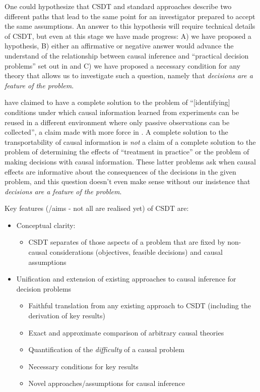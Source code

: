 One could hypothesize that CSDT and standard approaches describe two different paths that lead to the same point for an investigator prepared to accept the same assumptions. An answer to this hypothesis will require technical details of CSDT, but even at this stage we have made progress: A) we have proposed a hypothesis, B) either an affirmative or negative answer would advance the understand of the relationship between causal inference and ``practical decision problems'' set out in \citet{deaton_understanding_2018} and C) we have proposed a necessary condition for any theory that allows us to investigate such a question, namely that \emph{decisions are a feature of the problem}. 

\citet{bareinboim_transportability_2012} have claimed to have a complete solution to the problem of ``[identifying] conditions under which causal information learned from experiments can be reused in a different environment where only passive observations can be collected'', a claim made with more force in \citet{pearl_challenging_2018}. A complete solution to the transportability of causal information is \emph{not} a claim of a complete solution to the problem of determining the effects of ``treatment in practice'' or the problem of making decisions with causal information. These latter problems ask when causal effects are informative about the consequences of the decisions in the given problem, and this question doesn't even make sense without our insistence that \emph{decisions are a feature of the problem}.

Key features (/aims - not all are realised yet) of CSDT are:

\begin{itemize}
	\item Conceptual clarity:
	\begin{itemize}
		\item CSDT separates of those aspects of a problem that are fixed by non-causal considerations (objectives, feasible decisions) and causal assumptions
	\end{itemize}
	\item Unification and extension of existing approaches to causal inference for decision problems
	\begin{itemize}
		\item Faithful translation from any existing approach to CSDT (including the derivation of key results)
		\item Exact and approximate comparison of arbitrary causal theories
		\item Quantification of the \emph{difficulty} of a causal problem
		\item Necessary conditions for key results
		\item Novel approaches/assumptions for causal inference
	\end{itemize}	
\end{itemize}




